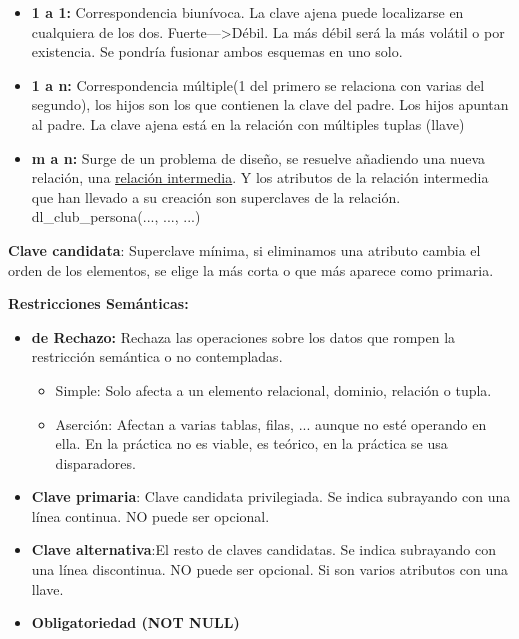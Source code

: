 \documentclass[12pt, twoside, openright]{report} %
\begin{document}
  \begin{itemize}
  \item \textbf{1 a 1:} Correspondencia biunívoca. La clave ajena puede
    localizarse en cualquiera de los dos. Fuerte---\textgreater Débil.
    La más débil será la más volátil o por existencia. Se pondría
    fusionar ambos esquemas en uno solo.
    
  \item \textbf{1 a n:} Correspondencia múltiple(1 del primero se relaciona
    con varias del segundo), los hijos son los que contienen la clave
    del padre. Los hijos apuntan al padre. La clave ajena está en la
    relación con múltiples tuplas (llave)
    
  \item \textbf{m a n:} Surge de un problema de diseño, se resuelve
    añadiendo una nueva relación, una \underline{relación intermedia}. Y
    los atributos de la relación intermedia que han llevado a su
    creación son superclaves de la relación.
    dl\_club\_persona(..., ..., ...)
    
  \end{itemize}

  
  \textbf{Clave candidata}: Superclave mínima, si eliminamos una
  atributo cambia el orden de los elementos, se elige la más corta o que
  más aparece como primaria.
  

  
  \textbf{Restricciones Semánticas:}
  

  \begin{itemize}
  \item \textbf{de Rechazo:} Rechaza las operaciones sobre los datos que
    rompen la restricción semántica o no contempladas.
    

    \begin{itemize}
    \item Simple: Solo afecta a un elemento relacional, dominio, relación o
      tupla.
      
    \item Aserción: Afectan a varias tablas, filas, ... aunque no esté
      operando en ella. En la práctica no es viable, es teórico, en la
      práctica se usa disparadores.
      
    \end{itemize}
  \item \textbf{Clave primaria}: Clave candidata privilegiada. Se indica
    subrayando con una línea continua. NO puede ser opcional.
    
  \item \textbf{Clave alternativa}:El resto de claves candidatas. Se indica
    subrayando con una línea discontinua. NO puede ser opcional. Si son
    varios atributos con una llave.
    
  \item \textbf{Obligatoriedad (NOT NULL)}
    
  \end{itemize}
\end{document}
